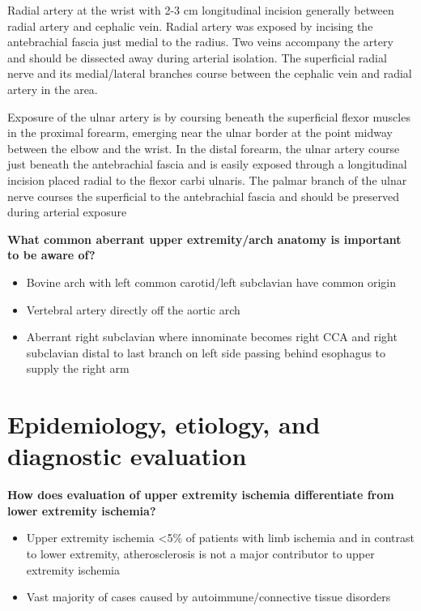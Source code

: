 \documentclass[
]{book}
\begin{document}
Radial artery at the wrist with 2-3 cm longitudinal incision generally
between radial artery and cephalic vein. Radial artery was exposed by
incising the antebrachial fascia just medial to the radius. Two veins
accompany the artery and should be dissected away during arterial
isolation. The superficial radial nerve and its medial/lateral branches
course between the cephalic vein and radial artery in the area.

Exposure of the ulnar artery is by coursing beneath the superficial
flexor muscles in the proximal forearm, emerging near the ulnar border
at the point midway between the elbow and the wrist. In the distal
forearm, the ulnar artery course just beneath the antebrachial fascia
and is easily exposed through a longitudinal incision placed radial to
the flexor carbi ulnaris. The palmar branch of the ulnar nerve courses
the superficial to the antebrachial fascia and should be preserved
during arterial exposure

\textbf{What common aberrant upper extremity/arch anatomy is important to be
aware of?}

\begin{itemize}
\item
  Bovine arch with left common carotid/left subclavian have common
  origin
\item
  Vertebral artery directly off the aortic arch
\item
  Aberrant right subclavian where innominate becomes right CCA and
  right subclavian distal to last branch on left side passing behind
  esophagus to supply the right arm
\end{itemize}

\hypertarget{epidemiology-etiology-and-diagnostic-evaluation}{%
\section{Epidemiology, etiology, and diagnostic evaluation}\label{epidemiology-etiology-and-diagnostic-evaluation}}

\textbf{How does evaluation of upper extremity ischemia differentiate from
lower extremity ischemia?} \citep{shuja117UpperExtremity}

\begin{itemize}
\item
  Upper extremity ischemia \textless5\% of patients with limb ischemia and in
  contrast to lower extremity, atherosclerosis is not a major
  contributor to upper extremity ischemia
\item
  Vast majority of cases caused by autoimmune/connective tissue
  disorders
\end{itemize}
\end{document}
